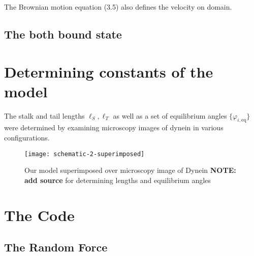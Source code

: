 		The Brownian motion equation (3.5) also defines the velocity on domain. 
		
		 
		\subsection{The both bound state}
		 
		\section{Determining constants of the model}
		The stalk and tail lengths $\ell_S, \ell_T$ as well as a set of equilibrium angles $\{\varphi_{i,\text{eq}}\}$ were determined by examining microscopy images of dynein in various configurations. 
		\begin{figure}[hbt!]
			\centering
			\texttt{[image: schematic-2-superimposed]}
			\caption{Our model superimposed over microscopy image of Dynein \textbf{NOTE: add source} for determining lengths and equilibrium angles} 
			\label{fig:superimpmosed}
		\end{figure}
	\section{The Code}
		\subsection{The Random Force}
